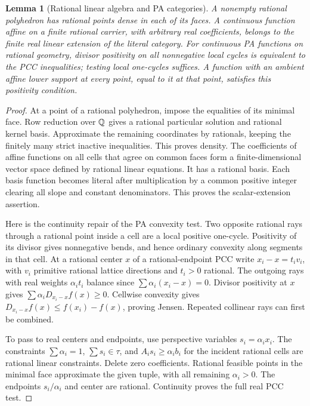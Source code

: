 \documentclass[11pt]{article}
\newtheorem{lemma}[theorem]{Lemma}
\theoremstyle{definition}\newtheorem{definition}[theorem]{Definition}
\theoremstyle{remark}\newtheorem{remark}[theorem]{Remark}
\begin{document}
\begin{lemma}[Rational linear algebra and PA categories]\label{lem:rational}
A nonempty rational polyhedron has rational points dense in each of its faces. A continuous function affine on a finite rational carrier, with arbitrary real coefficients, belongs to the finite real linear extension of the literal category. For continuous PA functions on rational geometry, divisor positivity on all nonnegative local cycles is equivalent to the PCC inequalities; testing local one-cycles suffices. A function with an ambient affine lower support at every point, equal to it at that point, satisfies this positivity condition.
\end{lemma}
\begin{proof}
At a point of a rational polyhedron, impose the equalities of its minimal face. Row reduction over $\mathbb Q$ gives a rational particular solution and rational kernel basis. Approximate the remaining coordinates by rationals, keeping the finitely many strict inactive inequalities. This proves density. The coefficients of affine functions on all cells that agree on common faces form a finite-dimensional vector space defined by rational linear equations. It has a rational basis. Each basis function becomes literal after multiplication by a common positive integer clearing all slope and constant denominators. This proves the scalar-extension assertion.

Here is the continuity repair of the PA convexity test. Two opposite rational rays through a rational point inside a cell are a local positive one-cycle. Positivity of its divisor gives nonnegative bends, and hence ordinary convexity along segments in that cell. At a rational center $x$ of a rational-endpoint PCC write $x_i-x=t_i v_i$, with $v_i$ primitive rational lattice directions and $t_i>0$ rational. The outgoing rays with real weights $\alpha_i t_i$ balance since $\sum\alpha_i(x_i-x)=0$. Divisor positivity at $x$ gives $\sum\alpha_i D_{x_i-x}f(x)\geq0$. Cellwise convexity gives $D_{x_i-x}f(x)\leq f(x_i)-f(x)$, proving Jensen. Repeated collinear rays can first be combined.

To pass to real centers and endpoints, use perspective variables $s_i=\alpha_i x_i$. The constraints $\sum\alpha_i=1$, $\sum s_i\in\tau$, and $A_i s_i\geq\alpha_i b_i$ for the incident rational cells are rational linear constraints. Delete zero coefficients. Rational feasible points in the minimal face approximate the given tuple, with all remaining $\alpha_i>0$. The endpoints $s_i/\alpha_i$ and center are rational. Continuity proves the full real PCC test.


\end{proof}
\end{document}
